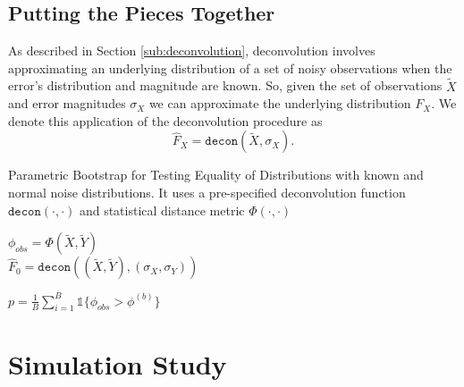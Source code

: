 \documentclass[12pt]{article}
\begin{document}
\subsection{Putting the Pieces Together} %
\label{sub:putting_the_pieces_together}

As described in Section \ref{sub:deconvolution}, deconvolution involves approximating an underlying distribution of a set of noisy observations when the error's distribution and magnitude are known. So, given the set of observations $\widetilde{X}$ and error magnitudes $\sigma_X$ we can approximate the underlying distribution $F_X$. We denote this application of the deconvolution procedure as
\begin{equation}
\widehat{F}_X = \texttt{decon}(\widetilde{X}, \sigma_X).
\end{equation}



\begin{algorithm}[H]
\caption{Parametric Bootstrap for Testing Equality of Distributions with known and normal noise distributions. It uses a pre-specified deconvolution function $\texttt{decon}(\cdot, \cdot)$ and statistical distance metric $\Phi(\cdot, \cdot)$}
\label{deconv_boot_test}


 $\phi_{obs} = \Phi(\widetilde{X}, \widetilde{Y})$\\
 $\widehat{F}_0 = \texttt{decon}((\widetilde{X}, \widetilde{Y}), (\sigma_X, \sigma_Y))$

 $p = \frac{1}{B}\sum_{i = 1}^B {{\mathds{1}}\{\phi_{obs} > \phi^{(b)}\}}$

\end{algorithm}







\section{Simulation Study} %
\label{sec:simulation_study}





\end{document}
